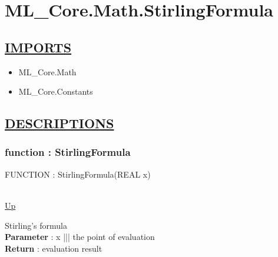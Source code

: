 \chapter*{ML\_Core.Math.StirlingFormula}
\hypertarget{ML_Core.Math.StirlingFormula}{}

\section*{\underline{IMPORTS}}
\begin{itemize}
\item ML\_Core.Math
\item ML\_Core.Constants
\end{itemize}

\section*{\underline{DESCRIPTIONS}}
\subsection*{function : StirlingFormula}
\hypertarget{ecldoc:ml_core.math.stirlingformula}{FUNCTION : StirlingFormula(REAL x)} \\
\hyperlink{ecldoc:}{Up} \\
\par
Stirling's formula \\
\textbf{Parameter} : x ||| the point of evaluation \\
\textbf{Return} : evaluation result \\
